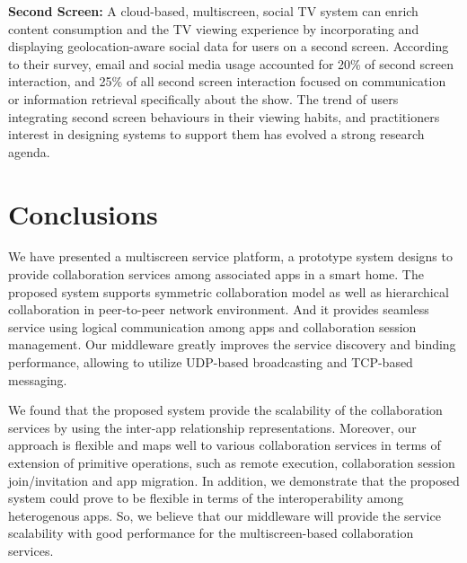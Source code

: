 \documentclass{sig-alternate}
\begin{document}
\noindent
\textbf{Second Screen:} 
A cloud-based, multiscreen, social TV system can enrich content consumption and the TV viewing experience by incorporating and displaying geolocation-aware social data for users on a second screen.
According to their survey, email and social media usage accounted for 20\% of second screen interaction, and 25\% of all second screen interaction focused on communication or information retrieval specifically about the show. 
The trend of users integrating second screen behaviours in their viewing habits, and practitioners interest in designing systems to support them has evolved a strong research agenda.


\section{Conclusions}
    \label{sc:Conclusion}
We have presented a multiscreen service platform, a prototype system designs to provide collaboration services among associated apps in a smart home. 
The proposed system supports symmetric collaboration model as well as hierarchical collaboration in peer-to-peer network environment.
And it provides seamless service using logical communication among apps and
collaboration session management.
Our middleware greatly improves the service discovery and binding performance, allowing to utilize UDP-based broadcasting and TCP-based messaging.

    We found that the proposed system provide the scalability of the collaboration services by using the inter-app relationship representations.
    Moreover, our approach is flexible and maps well to various collaboration services in terms of extension of primitive operations, such as remote execution, collaboration session join/invitation and app migration.
In addition, we demonstrate that the proposed system could prove to be flexible in terms of the interoperability among heterogenous apps. 
So, we believe that our middleware will provide the service scalability with good performance for the multiscreen-based collaboration services.
\end{document}
